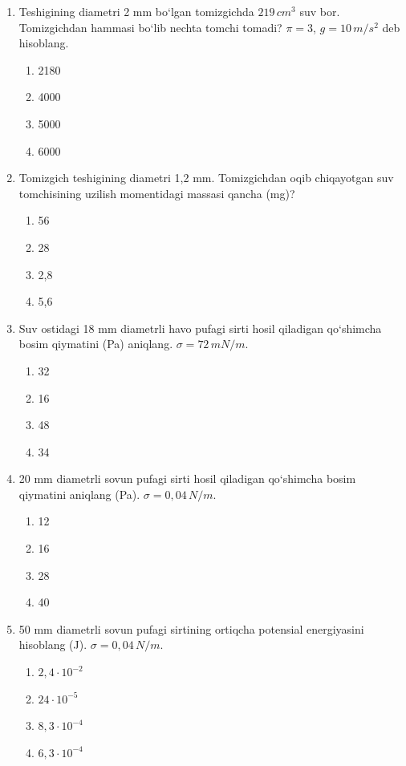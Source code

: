 \begin{enumerate}
\item Teshigining diametri 2 mm bo‘lgan tomizgichda $219 \, cm^3$ suv bor. Tomizgichdan hammasi bo‘lib nechta tomchi tomadi? $\pi = 3$, $g = 10 \, m/s^2$ deb hisoblang.
\begin{enumerate}[label=\Alph*)]
\item 2180
\item 4000
\item 5000
\item 6000
\end{enumerate}

\item Tomizgich teshigining diametri 1,2 mm. Tomizgichdan oqib chiqayotgan suv tomchisining uzilish momentidagi massasi qancha (mg)?
\begin{enumerate}[label=\Alph*)]
\item 56
\item 28
\item 2,8
\item 5,6
\end{enumerate}

\item Suv ostidagi 18 mm diametrli havo pufagi sirti hosil qiladigan qo‘shimcha bosim qiymatini (Pa) aniqlang. $\sigma = 72 \, mN/m$.
\begin{enumerate}[label=\Alph*)]
\item 32
\item 16
\item 48
\item 34
\end{enumerate}

\item 20 mm diametrli sovun pufagi sirti hosil qiladigan qo‘shimcha bosim qiymatini aniqlang (Pa). $\sigma = 0,04 \, N/m$.
\begin{enumerate}[label=\Alph*)]
\item 12
\item 16
\item 28
\item 40
\end{enumerate}

\item 50 mm diametrli sovun pufagi sirtining ortiqcha potensial energiyasini hisoblang (J). $\sigma = 0,04 \, N/m$.
\begin{enumerate}[label=\Alph*)]
\item $2,4 \cdot 10^{-2}$
\item $24 \cdot 10^{-5}$
\item $8,3 \cdot 10^{-4}$
\item $6,3 \cdot 10^{-4}$
\end{enumerate}


\end{enumerate}
